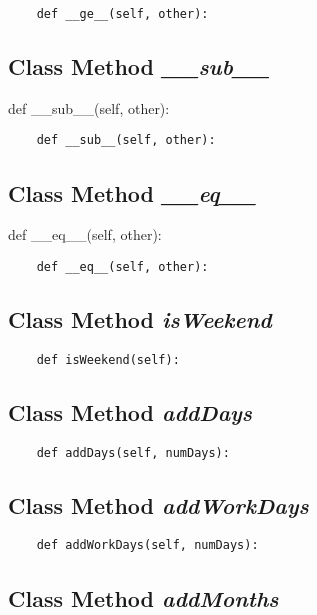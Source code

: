 \documentclass[twoside,11pt]{book}
\begin{document}
\begin{lstlisting}
    def __ge__(self, other):
\end{lstlisting}

\subsection{Class Method {\it \_\_sub\_\_}}
def \_\_sub\_\_(self, other):

\begin{lstlisting}
    def __sub__(self, other):
\end{lstlisting}

\subsection{Class Method {\it \_\_eq\_\_}}
def \_\_eq\_\_(self, other):

\begin{lstlisting}
    def __eq__(self, other):
\end{lstlisting}

\subsection{Class Method {\it isWeekend}}


\begin{lstlisting}
    def isWeekend(self):
\end{lstlisting}

\subsection{Class Method {\it addDays}}


\begin{lstlisting}
    def addDays(self, numDays):
\end{lstlisting}

\subsection{Class Method {\it addWorkDays}}


\begin{lstlisting}
    def addWorkDays(self, numDays):
\end{lstlisting}

\subsection{Class Method {\it addMonths}}
\end{document}
